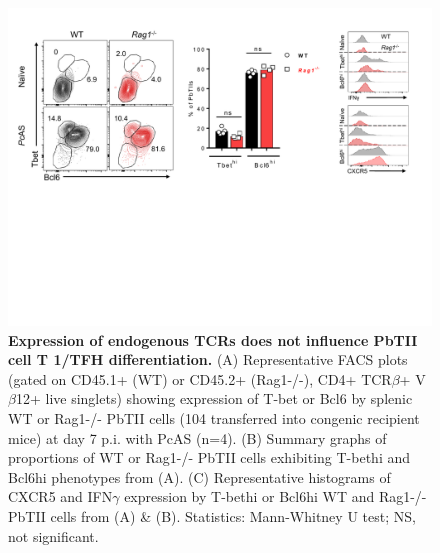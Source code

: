\begin{figure}
    \centering
    \includegraphics[width=\textwidth]{"Fig S11 rev3"}
    \caption[Expression of endogenous TCRs does not influence PbTII cell T 1/TFH differentiation]{\textbf{Expression of endogenous TCRs does not influence PbTII cell T 1/TFH differentiation.} (A) Representative FACS plots (gated on CD45.1+ (WT) or CD45.2+ (Rag1-/-), CD4+ TCR\( \beta \)+ V\( \beta \)12+ live singlets) showing expression of T-bet or Bcl6 by splenic WT or Rag1-/- PbTII cells (104 transferred into congenic recipient mice) at day 7 p.i. with PcAS (n=4). (B) Summary graphs of proportions of WT or Rag1-/- PbTII cells exhibiting T-bethi and Bcl6hi phenotypes from (A). (C) Representative histograms of CXCR5 and IFN\( \gamma \) expression by T-bethi or Bcl6hi WT and Rag1-/- PbTII cells from (A) \& (B). Statistics: Mann-Whitney U test; NS, not significant.}
    \label{fig:ms11}
\end{figure}

